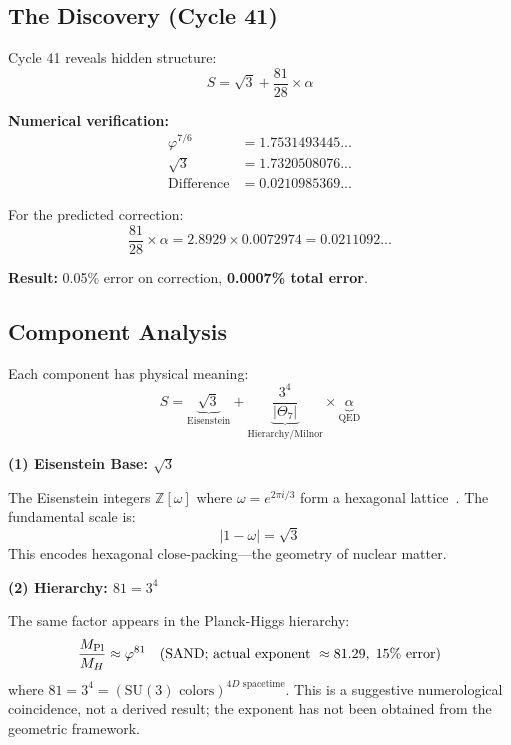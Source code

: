 \documentclass[aps,prd,twocolumn,superscriptaddress,floatfix,nofootinbib]{revtex4-2}
\theoremstyle{definition}
\theoremstyle{remark}
\newcommand{\vp}{\varphi}
\newcommand{\Th}{\Theta}
\begin{document}
\subsection{The Discovery (Cycle 41)}

Cycle 41 reveals hidden structure:
\begin{equation}
S = \sqrt{3} + \frac{81}{28} \times \alpha
\label{eq:stiffness-decomp}
\end{equation}

\textbf{Numerical verification:}
\begin{align}
\vp^{7/6} &= 1.7531493445... \\
\sqrt{3} &= 1.7320508076... \\
\text{Difference} &= 0.0210985369...
\end{align}

For the predicted correction:
\begin{equation}
\frac{81}{28} \times \alpha = 2.8929 \times 0.0072974 = 0.0211092...
\end{equation}

\textbf{Result:} 0.05\% error on correction, \textbf{0.0007\% total error}.

\subsection{Component Analysis}

Each component has physical meaning:
\begin{equation}
S = \underbrace{\sqrt{3}}_{\text{Eisenstein}} + \underbrace{\frac{3^4}{|\Th_7|}}_{\text{Hierarchy/Milnor}} \times \underbrace{\alpha}_{\text{QED}}
\end{equation}

\textbf{(1) Eisenstein Base: $\sqrt{3}$}

The Eisenstein integers $\mathbb{Z}[\omega]$ where $\omega = e^{2\pi i/3}$ form a hexagonal lattice~\cite{eisenstein}. The fundamental scale is:
\begin{equation}
|1 - \omega| = \sqrt{3}
\end{equation}
This encodes hexagonal close-packing---the geometry of nuclear matter.

\textbf{(2) Hierarchy: $81 = 3^4$}

The same factor appears in the Planck-Higgs hierarchy:
\begin{equation}
\frac{M_{\rm Pl}}{M_H} \approx \vp^{81} \quad (\text{SAND; actual exponent } \approx 81.29,\;\text{15\% error})
\end{equation}
where $81 = 3^4 = (\text{SU}(3)\text{ colors})^{4D\text{ spacetime}}$. This is a suggestive numerological coincidence, not a derived result; the exponent has not been obtained from the geometric framework.
\end{document}
